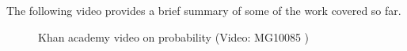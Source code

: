     \noindent
\label{m39377*eip-778}The following video provides a brief summary of some of the
work covered so far.
    \setcounter{subfigure}{0}
	\begin{figure}[H] %
    \textnormal{Khan academy video on
probability}\vspace{.1in} \nopagebreak
  \label{m39377*yt-media}\label{m39377*yt-video}
             { (Video:  MG10085 )}
      \vspace{2pt}
    \vspace{.1in}
 \end{figure}       \par \label{m39377*secfhsst!!!underscore!!!id985}

